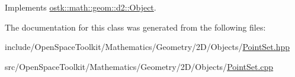 Implements \hyperlink{classostk_1_1math_1_1geom_1_1d2_1_1_object_ada4c2187dd24ef02b91b6346191f677c}{ostk\+::math\+::geom\+::d2\+::\+Object}.



The documentation for this class was generated from the following files\+:\begin{DoxyCompactItemize}
\item 
include/\+Open\+Space\+Toolkit/\+Mathematics/\+Geometry/2\+D/\+Objects/\hyperlink{2_d_2_objects_2_point_set_8hpp}{Point\+Set.\+hpp}\item 
src/\+Open\+Space\+Toolkit/\+Mathematics/\+Geometry/2\+D/\+Objects/\hyperlink{2_d_2_objects_2_point_set_8cpp}{Point\+Set.\+cpp}\end{DoxyCompactItemize}

